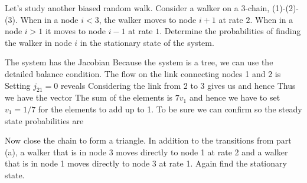 Let’s study another biased random walk.
\subquestion
Consider a walker on a 3-chain, (1)-(2)-(3). When in a node $i<3$, the walker moves to node $i+1$ at rate $2$. When in a node $i>1$ it moves to node $i-1$ at rate $1$. Determine the probabilities of finding the walker in node $i$ in the stationary state of the system.

\solution 
The system has the Jacobian
Because the system is a tree, we can use the detailed balance condition. The flow on the link connecting nodes 1 and 2 is 
Setting $j_{21}=0$ reveals 
Considering the link from 2 to 3 gives us 
and hence 
Thus we have the vector 
The sum of the elements is $7v_1$ and hence we have to set $v_1=1/7$ for the elements to add up to 1. To be sure we can confirm
so the steady state probabilities are 

\subquestion 
Now close the chain to form a triangle. In addition to the transitions from part (a), a walker that is in node 3 moves directly to node 1 at rate 2 and a walker that is in node 1 moves directly to node 3 at rate 1. Again find the stationary state.

